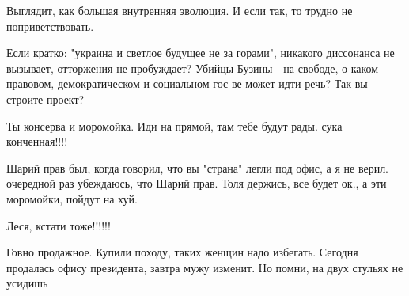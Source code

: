 \begin{itemize}
Выглядит, как большая внутренняя эволюция. И если так, то трудно не поприветствовать.

 

Если кратко: "украина и светлое будущее не за горами", никакого диссонанса не
вызывает, отторжения не пробуждает? Убийцы Бузины - на свободе, о каком
правовом, демократическом и социальном гос-ве может идти речь? Так вы строите
проект?


 

Ты консерва и моромойка. Иди на прямой, там тебе будут рады. сука конченная!!!!

\begin{itemize}
 
Шарий прав был, когда говорил, что вы "страна" легли под офис, а я не
верил. очередной раз убеждаюсь, что Шарий прав. Толя держись, все будет ок., а эти
моромойки, пойдут на хуй.

 
Леся, кстати тоже!!!!!!
\end{itemize}

 
Говно продажное. Купили походу, таких женщин надо избегать. Сегодня продалась
офису президента, завтра мужу изменит. Но помни, на двух стульях не усидишь

 

\end{itemize}

